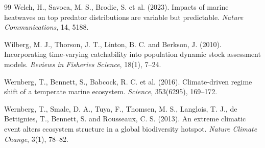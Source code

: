 \documentclass[11pt,a4paper]{article}
\begin{document}
\begin{thebibliography}{99}
Welch, H., Savoca, M. S., Brodie, S. et al. (2023). Impacts of marine heatwaves on top predator distributions are variable but predictable. \textit{Nature Communications}, 14, 5188.

Wilberg, M. J., Thorson, J. T., Linton, B. C. and Berkson, J. (2010). Incorporating time-varying catchability into population dynamic stock assessment models. \textit{Reviews in Fisheries Science}, 18(1), 7--24.

Wernberg, T., Bennett, S., Babcock, R. C. et al. (2016). Climate-driven regime shift of a temperate marine ecosystem. \textit{Science}, 353(6295), 169--172.

Wernberg, T., Smale, D. A., Tuya, F., Thomsen, M. S., Langlois, T. J., de Bettignies, T., Bennett, S. and Rousseaux, C. S. (2013). An extreme climatic event alters ecosystem structure in a global biodiversity hotspot. \textit{Nature Climate Change}, 3(1), 78--82.

\end{thebibliography}
\end{document}
